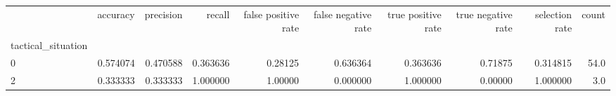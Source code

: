 \begin{tabular}{lrrrrrrrrr}
\toprule
{} &  accuracy &  precision &    recall &  false positive rate &  false negative rate &  true positive rate &  true negative rate &  selection rate &  count \\
tactical\_situation &           &            &           &                      &                      &                     &                     &                 &        \\
\midrule
0                  &  0.574074 &   0.470588 &  0.363636 &              0.28125 &             0.636364 &            0.363636 &             0.71875 &        0.314815 &   54.0 \\
2                  &  0.333333 &   0.333333 &  1.000000 &              1.00000 &             0.000000 &            1.000000 &             0.00000 &        1.000000 &    3.0 \\
\bottomrule
\end{tabular}
